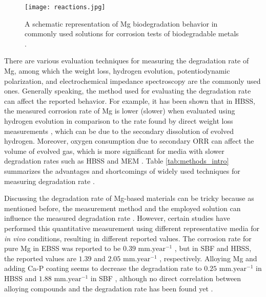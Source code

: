 \begin{figure}
\centering
\medskip
\texttt{[image: reactions.jpg]}
\caption[Mg biodegradation behavior in commonly used test solutions]{A schematic representation of Mg biodegradation behavior in commonly used solutions for corrosion tests of biodegradable metals \cite{Mei2020}.} \label{fig:reactions_intro}
\end{figure}


There are various evaluation techniques for measuring the degradation rate of Mg, among which the weight loss, hydrogen evolution, potentiodynamic polarization, and electrochemical impedance spectroscopy are the commonly used ones. Generally speaking, the method used for evaluating the degradation rate can affect the reported behavior. For example, it has been shown that in \gls{HBSS}, the measured corrosion rate of Mg is lower (slower) when evaluated using hydrogen evolution in comparison to the rate found by direct weight loss measurements \cite{Johnston2015,Johnston2019}, which can be due to the secondary dissolution of evolved hydrogen. Moreover, oxygen consumption due to secondary \gls{ORR} can affect the volume of evolved gas, which is more significant for media with slower degradation rates such as \gls{HBSS} and \gls{MEM} \cite{Wang2020}. Table \ref{tab:methods_intro} summarizes the advantages and shortcomings of widely used techniques for measuring degradation rate \cite{Mei2020}.

Discussing the degradation rate of Mg-based materials can be tricky because as mentioned before, the measurement method and the employed solution can influence the measured degradation rate \cite{Pogorielov2017}. However, certain studies have performed this quantitative measurement using different representative media for \textit{in vivo} conditions, resulting in different reported values. The corrosion rate for pure Mg in \gls{EBSS} was reported to be $0.39 \text{ mm.year}^{-1}$ \cite{Walker2012}, but in \gls{SBF} and \gls{HBSS}, the reported values are $1.39$ \cite{Gu2009} and $2.05 \text{ mm.year}^{-1}$ \cite{Abidin2013}, respectively. Alloying Mg and adding Ca-P coating seems to decrease the degradation rate to $0.25 \text{ mm.year}^{-1}$ in \gls{HBSS} \cite{Wang2011} and $1.88 \text{ mm.year}^{-1}$ in \gls{SBF} \cite{Barfield2012}, although no direct correlation between alloying compounds and the degradation rate has been found yet \cite{Sanchez2015}.

